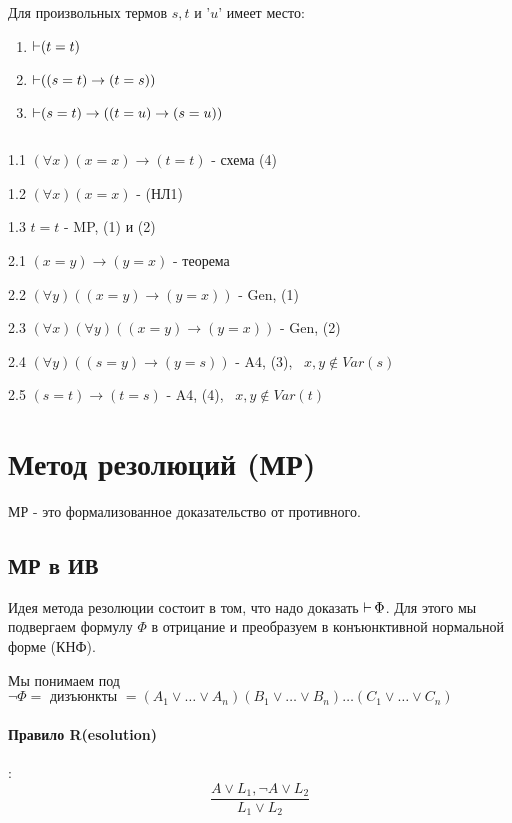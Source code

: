 \begin{theorem}
Для произвольных термов $s,t$ и  '$u$' имеет место:
 \begin{enumerate}
     \item $\operatorname{\vdash} (t = t)$
     \item  $\operatorname{\vdash} ((s = t) \to (t = s))$
     \item $\operatorname{\vdash}(s = t) \to ((t = u) \to (s = u))$
\end{enumerate}
\end{theorem}

\begin{myproof}
    ${}$\newline

1.1  $(\forall x)(x = x) \to (t = t)$ - схема (4)

1.2 $(\forall x)(x = x)$ - (НЛ1)

1.3 $t = t$ - MP, (1) и (2)

\medskip

2.1 $(x = y) \to (y = x)$ - теорема

2.2 $(\forall y)((x = y) \to (y = x))$ - Gen, (1)

2.3 $(\forall x)(\forall y)((x = y) \to (y = x))$ - Gen, (2)

2.4 $(\forall y)((s = y) \to (y = s))$ - A4, (3), \ $x,y \not\in Var(s)$

2.5 $(s = t) \to (t = s)$ - A4, (4), \ $x,y \not\in Var(t)$ 
\end{myproof}

\section{Метод резолюций (МР)}

МР - это формализованное доказательство от противного.

\subsection{МР в ИВ}

Идея метода резолюции состоит в том, что надо доказать $\operatorname{\vdash} \Phi$. Для этого
мы подвергаем формулу  $\Phi$ в отрицание и преобразуем в конъюнктивной нормальной форме (КНФ).  

Мы понимаем под
$\lnot \Phi = \text{ дизъюнкты } = (A_1 \lor \ldots \lor A_n)(B_1 \lor \ldots\lor B_n)\ldots(C_1 \lor \ldots
\lor C_n)$

\paragraph*{Правило R(esolution)}: \[
\frac{A \lor L_1, \lnot A \lor L_2}{L_1 \lor L_2}
\] 

